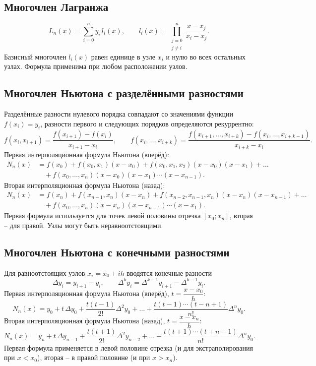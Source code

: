 \documentclass[12pt,a4paper]{article}
\begin{document}
\subsection*{Многочлен Лагранжа}
\[
    L_n(x)=\sum_{i=0}^{n}y_i\,l_i(x),\qquad
    l_i(x)=\prod_{\substack{j=0\\ j\ne i}}^{n}\frac{x-x_j}{x_i-x_j}.
\]
Базисный многочлен $l_i(x)$ равен единице в узле $x_i$ и нулю во всех остальных узлах. Формула применима при любом расположении узлов.

\subsection*{Многочлен Ньютона с разделёнными разностями}
Разделённые разности нулевого порядка совпадают со значениями функции $f(x_i)=y_i$, разности первого и следующих порядков определяются рекуррентно:
\[
    f(x_i,x_{i+1})=\frac{f(x_{i+1})-f(x_i)}{x_{i+1}-x_i},\qquad
    f(x_i,\ldots,x_{i+k})=\frac{f(x_{i+1},\ldots,x_{i+k})-f(x_i,\ldots,x_{i+k-1})}{x_{i+k}-x_i}.
\]
Первая интерполяционная формула Ньютона (вперёд):
\[
\begin{aligned}
    N_n(x)&=f(x_0)+f(x_0,x_1)(x-x_0)+f(x_0,x_1,x_2)(x-x_0)(x-x_1)+\ldots\\
    &\quad+f(x_0,\ldots,x_n)(x-x_0)(x-x_1)\cdots(x-x_{n-1}).
\end{aligned}
\]
Вторая интерполяционная формула Ньютона (назад):
\[
\begin{aligned}
    N_n(x)&=f(x_n)+f(x_{n-1},x_n)(x-x_n)+f(x_{n-2},x_{n-1},x_n)(x-x_n)(x-x_{n-1})+\ldots\\
    &\quad+f(x_0,\ldots,x_n)(x-x_n)(x-x_{n-1})\cdots(x-x_1).
\end{aligned}
\]
Первая формула используется для точек левой половины отрезка $[x_0;x_n]$, вторая -- для правой. Узлы могут быть неравноотстоящими.

\subsection*{Многочлен Ньютона с конечными разностями}
Для равноотстоящих узлов $x_i=x_0+ih$ вводятся конечные разности
\[
    \Delta y_i=y_{i+1}-y_i,\qquad \Delta^k y_i=\Delta^{k-1}y_{i+1}-\Delta^{k-1}y_i .
\]
Первая интерполяционная формула Ньютона (вперёд), $t=\dfrac{x-x_0}{h}$:
\[
    N_n(x)=y_0+t\,\Delta y_0+\frac{t(t-1)}{2!}\Delta^2y_0+\ldots+\frac{t(t-1)\cdots(t-n+1)}{n!}\Delta^ny_0 .
\]
Вторая интерполяционная формула Ньютона (назад), $t=\dfrac{x-x_n}{h}$:
\[
    N_n(x)=y_n+t\,\Delta y_{n-1}+\frac{t(t+1)}{2!}\Delta^2y_{n-2}+\ldots+\frac{t(t+1)\cdots(t+n-1)}{n!}\Delta^ny_0 .
\]
Первая формула применяется в левой половине отрезка (и для экстраполирования при $x<x_0$), вторая -- в правой половине (и при $x>x_n$).
\end{document}
